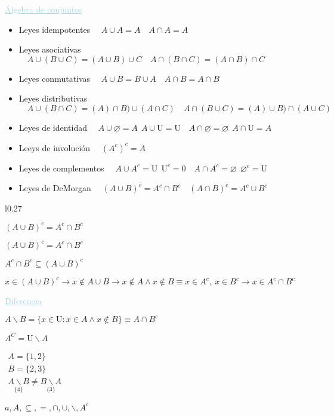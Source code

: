 \documentclass[12pt]{article}
\begin{document}
\textcolor{lightblue}{\underline{Álgebra de conjuntos}}
\begin{itemize}
	\item Leyes idempotentes $\quad A\cup A=A\quad A\cap A=A$
	\item Leyes asociativas $\quad A\cup(B\cup C)=(A\cup B)\cup C\quad A\cap(B\cap C)=(A\cap B)\cap C$
	\item Leyes conmutativas $\quad A\cup B=B\cup A\quad A\cap B=A\cap B$
	\item Leyes distributivas$\quad A\cup(B\cap C)=(A)\cap B)\cup(A\cap C) \quad A\cap(B\cup C)=(A)\cup B)\cap(A\cup C) $
	\item Leyes de identidad $\quad A\cup \varnothing=A~~A\cup\mathrm{U}=\mathrm{U}\quad A\cap\varnothing=\varnothing~~A\cap\mathrm{U}=A$
	\item Leeys de involución $\quad(A^c)^c=A$
	\item Leyes de complementos $\quad A\cup A^c=\mathrm{U}~~\mathrm{U}^c=0\quad A\cap A^c=\varnothing~~\varnothing^c=\mathrm{U}$
	\item Leyes de DeMorgan $\quad(A\cup B)^c=A^c\cap B^c\quad(A\cap B)^c=A^c\cup B^c$
\end{itemize}
\begin{wrapfigure}[4]{l}{0.27\textwidth}
	\begin{venndiagram2sets}[shade=lightblue!50]
	\fillNotAorB
\end{venndiagram2sets}
\end{wrapfigure}

	$(A\cup B)^c=A^c\cap B^c$
	
	$(A\cup B)^c=A^c\cap B^c$
	
	$A^c\cap B^c\subseteq(A\cup B)^c$
	
	$x\in(A\cup B)^c\rightarrow x\notin A\cup B\rightarrow x\notin A\wedge x\notin B\equiv x\in A^c,~x\in 
	B^c\rightarrow x\in A^c\cap B^c$

\textcolor{lightblue}{\underline{Diferencia}}

$A\backslash B=\{x\in\mathrm{U}:x\in A\wedge x\notin B\}\equiv A\cap B^c$

$A^C=\mathrm{U}\backslash A$

$\begin{array}{l}
	A=\{1,2\}\\
	B=\{2,3\}\\
	\underset{\{4\}}{A\backslash B}\neq\underset{\{3\}}{B\backslash A}
\end{array}$

$a,A,\subseteq,=,\cap,\cup,\backslash,A^c$
\end{document}
